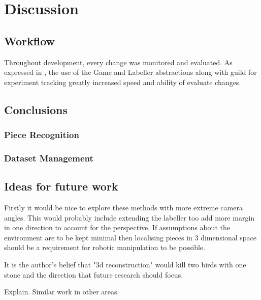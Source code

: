 \chapter{Discussion}
\label{conclusions}

\section{Workflow}
Throughout development, every change was monitored and evaluated.  As expressed in , the use of the Game and Labeller
abstractions along with guild for experiment tracking greatly increased speed and ability of evaluate changes. 

\section{Conclusions}

\subsection{Piece Recognition}

\subsection{Dataset Management}

\section{Ideas for future work}
Firstly it would be nice to explore these methods with more extreme camera angles.  This would probably include extending the labeller too add more 
margin in one direction to account for the perspective. If assumptions about the environment are to be kept minimal
then localising pieces in 3 dimensional space should be a requirement for robotic manipulation to be possible.

It is the author's belief that "3d reconstruction" would kill two birds with one stone and the direction that future research should focus.

Explain.  Similar work in other areas.